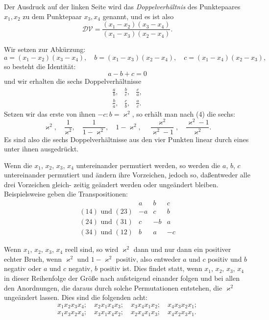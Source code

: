 \documentclass[12pt,a4paper]{book}
\theoremstyle{definition}
\begin{document}
Der Ausdruck auf der linken Seite wird das \emph{Doppelverh\"altnis} des Punktepaares $x_1, x_2$ zu dem Punktepaar $x_3, x_4$ genannt, und es ist also
\begin{equation}
\mathcal{DV} = \frac{(x_1 - x_2)(x_3 - x_4)}{(x_1 - x_3)(x_2 - x_4)}.
\end{equation}

Wir setzen zur Abk\"urzung:
\[
a = (x_1 - x_2)(x_3 - x_4), \quad b = (x_1 - x_3)(x_2 - x_4), \quad c = (x_1 - x_4)(x_2 - x_3),
\]
so besteht die Identit\"at:
\begin{equation}
a - b + c = 0
\end{equation}
und wir erhalten die sechs Doppelverh\"altnisse
\begin{equation}
\begin{array}{ccc}
\displaystyle\frac{a}{b}, & \displaystyle\frac{b}{c}, & \displaystyle\frac{c}{a},\\[1em]
\displaystyle\frac{b}{a}, & \displaystyle\frac{c}{b}, & \displaystyle\frac{a}{c}.
\end{array}
\end{equation}
Setzen wir das erste von ihnen $-c:b = \varkappa^2$, so erh\"alt man
nach (4) die sechs:
\begin{equation}
\varkappa^2, \quad \frac{1}{\varkappa^2}, \quad \frac{1}{1 - \varkappa^2}, \quad 1 - \varkappa^2, \quad \frac{\varkappa^2}{\varkappa^2 - 1}, \quad \frac{\varkappa^2 - 1}{\varkappa^2}.
\end{equation}
Es sind also die sechs Doppelverh\"altnisse aus den vier Punkten
linear durch eines unter ihnen ausgedr\"uckt.

Wenn die $x_1$, $x_2$, $x_3$, $x_4$ untereinander permutiert werden, so
werden die $a$, $b$, $c$ untereinander permutiert und \"andern ihre
Vorzeichen, jedoch so, da\ss entweder alle drei Vorzeichen gleich-
zeitig ge\"andert werden oder unge\"andert bleiben. Beispielsweise
geben die Transpositionen:
\[
\begin{array}{c|cccccc}
& a & b & c \\ \hline
(14) \text{ und } (23) & -a & c & b \\
(24) \text{ und } (31) & c & -b & a \\
(34) \text{ und } (12) & b & a & -c
\end{array}
\]

Wenn $x_1$, $x_2$, $x_3$, $x_4$ reell sind, so wird $\varkappa^2$ dann und nur
dann ein positiver echter Bruch, wenn $\varkappa^2$ und $1 - \varkappa^2$ positiv,
also entweder $a$ und $c$ positiv und $b$ negativ oder $a$ und $c$ negativ,
$b$ positiv ist. Dies findet statt, wenn $x_1$, $x_2$, $x_3$, $x_4$ in dieser
Reihenfolge der Gr\"o\ss e nach aufsteigend einander folgen und bei
allen den Anordnungen, die daraus durch solche Permutationen
entstehen, die $\varkappa^2$ unge\"andert lassen. Dies sind die folgenden acht:
\begin{equation}
\begin{array}{c}
x_1 x_2 x_3 x_4;\quad x_2 x_1 x_4 x_3;\quad x_3 x_4 x_1 x_2;\quad x_4 x_3 x_2 x_1;\\
x_1 x_3 x_2 x_4;\quad x_3 x_1 x_4 x_2;\quad x_2 x_4 x_1 x_3;\quad x_4 x_2 x_3 x_1.
\end{array}
\end{equation}
\end{document}
